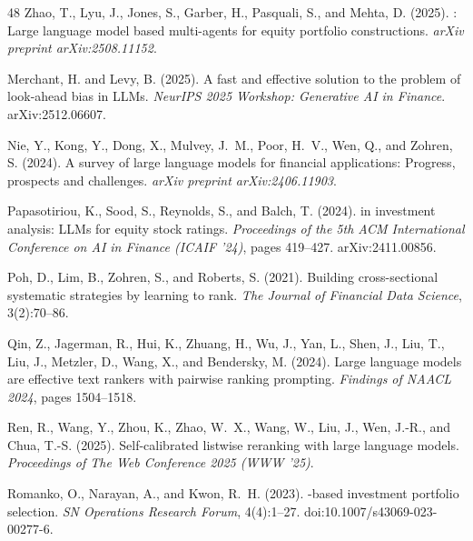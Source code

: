 {\begin{thebibliography}{48}
Zhao, T., Lyu, J., Jones, S., Garber, H., Pasquali, S., and Mehta, D. (2025).
: Large language model based multi-agents for equity portfolio constructions.
\newblock \emph{arXiv preprint arXiv:2508.11152}.

Merchant, H. and Levy, B. (2025).
\newblock A fast and effective solution to the problem of look-ahead bias in {LLMs}.
\newblock \emph{NeurIPS 2025 Workshop: Generative AI in Finance}. arXiv:2512.06607.

Nie, Y., Kong, Y., Dong, X., Mulvey, J.~M., Poor, H.~V., Wen, Q., and Zohren, S. (2024).
\newblock A survey of large language models for financial applications: Progress, prospects and challenges.
\newblock \emph{arXiv preprint arXiv:2406.11903}.

Papasotiriou, K., Sood, S., Reynolds, S., and Balch, T. (2024).
 in investment analysis: {LLMs} for equity stock ratings.
\newblock \emph{Proceedings of the 5th ACM International Conference on AI in Finance (ICAIF '24)}, pages 419--427. arXiv:2411.00856.

Poh, D., Lim, B., Zohren, S., and Roberts, S. (2021).
\newblock Building cross-sectional systematic strategies by learning to rank.
\newblock \emph{The Journal of Financial Data Science}, 3(2):70--86.

Qin, Z., Jagerman, R., Hui, K., Zhuang, H., Wu, J., Yan, L., Shen, J., Liu, T., Liu, J., Metzler, D., Wang, X., and Bendersky, M. (2024).
\newblock Large language models are effective text rankers with pairwise ranking prompting.
\newblock \emph{Findings of NAACL 2024}, pages 1504--1518.

Ren, R., Wang, Y., Zhou, K., Zhao, W.~X., Wang, W., Liu, J., Wen, J.-R., and Chua, T.-S. (2025).
\newblock Self-calibrated listwise reranking with large language models.
\newblock \emph{Proceedings of The Web Conference 2025 (WWW '25)}.

Romanko, O., Narayan, A., and Kwon, R.~H. (2023).
-based investment portfolio selection.
\newblock \emph{SN Operations Research Forum}, 4(4):1--27. doi:10.1007/s43069-023-00277-6.


\end{thebibliography}}
